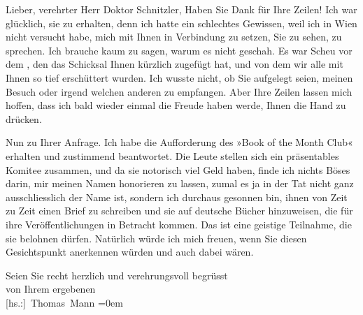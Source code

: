 \pstart{}Lieber, verehrter Herr Doktor Schnitzler,\pend\vspace{0.5em}
\pstart
           Haben Sie Dank für Ihre Zeilen! Ich war glücklich, sie zu erhalten, denn ich hatte
               ein schlechtes Gewissen, weil ich in Wien nicht
               versucht habe, mich mit Ihnen in Verbindung zu setzen, Sie zu sehen, zu sprechen. Ich
               brauche kaum zu sagen, warum es nicht geschah. Es war Scheu vor dem \label{K_L02508-1v}\label{K_L02508-1}, den das Schicksal Ihnen kürzlich zugefügt hat, und von dem wir alle mit
               Ihnen so tief erschüttert wurden. Ich wusste nicht, ob Sie aufgelegt seien, meinen
               Besuch oder irgend welchen anderen zu empfangen. Aber Ihre Zeilen lassen mich hoffen,
               dass ich bald wieder einmal die Freude haben werde, Ihnen die Hand zu drücken.\pend
           
\pstart
           Nun zu Ihrer Anfrage. Ich habe die Aufforderung des »Book of the Month Club« erhalten und zustimmend beantwortet. Die Leute
               stellen sich ein präsentables Komitee zusammen, und da sie notorisch viel Geld haben,
               finde ich nichts Böses darin, mir meinen Namen honorieren zu lassen, zumal es ja in
               der Tat nicht ganz ausschliesslich der Name ist, sondern ich durchaus gesonnen bin,
               ihnen von Zeit zu Zeit einen Brief zu schreiben und sie auf deutsche Bücher
               hinzuweisen, die für ihre Veröffentlichungen in Betracht kommen. Das ist eine
               geistige Teilnahme, die sie belohnen {\pb}dürfen. Natürlich würde ich mich freuen, wenn Sie diesen Gesichtspunkt anerkennen
               würden und auch dabei wären.\pend
           
\pstart
           Seien Sie recht herzlich und verehrungsvoll begrüsst{\\[\baselineskip]} von Ihrem ergebenen{\\[\baselineskip]}\spacefill\mbox{{[}hs.:{]} Thomas Mann}\pend
           \leftskip=0em{}\endnumbering{}  \newcommand{\dateiname}{L02508}\newcommand{\titel}{Thomas Mann an Arthur Schnitzler, 1. 2. 1929}\newcommand{\editorInnen}{Martin Anton Müller und Gerd-Hermann Susen}
